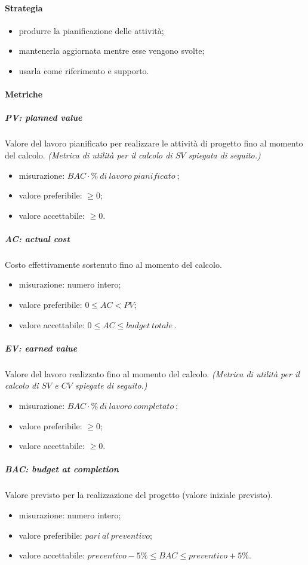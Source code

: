 		\paragraph{Strategia}
		\begin{itemize}
			\item produrre la pianificazione delle attività;
			\item mantenerla aggiornata mentre esse vengono svolte;
			\item usarla come riferimento e supporto.
		\end{itemize}		
		\paragraph{Metriche}
		\subparagraph{PV: planned value}
		Valore del lavoro pianificato per realizzare le attività di progetto fino al momento del calcolo.
		 \textit{(Metrica di utilità per il calcolo di $SV$ spiegata di seguito.)}
			\begin{itemize}
				\item  misurazione: $BAC \cdot \%\ di\ lavoro\ pianificato\ $;
				\item  valore preferibile: $ \geq 0$;
				\item  valore accettabile: $ \geq 0$.
			\end{itemize}	
		\subparagraph{AC: actual cost}
			Costo effettivamente sostenuto fino al momento del calcolo.
			\begin{itemize}
				\item  misurazione: numero intero;
				\item  valore preferibile: $0 \leq AC < PV$;
				\item  valore accettabile: $0 \leq AC \leq budget\ totale\ $.
			\end{itemize}
		\subparagraph{EV: earned value}
		Valore del lavoro realizzato fino al momento del calcolo.
		 \textit{(Metrica di utilità per il calcolo di $SV$ e $CV$ spiegate di seguito.)}
			\begin{itemize}
				\item  misurazione: $BAC \cdot \%\ di\ lavoro\ completato\ $;
				\item  valore preferibile: $ \geq 0$;
				\item  valore accettabile: $ \geq 0$.
			\end{itemize}
		\subparagraph{BAC: budget at completion}
		Valore previsto per la realizzazione del progetto (valore iniziale previsto).
		\begin{itemize}
			\item misurazione: numero intero;
			\item valore preferibile: $pari\ al\ preventivo$;
			\item valore accettabile: $preventivo -5\% \leq BAC \leq preventivo + 5\%$. 
		\end{itemize}
